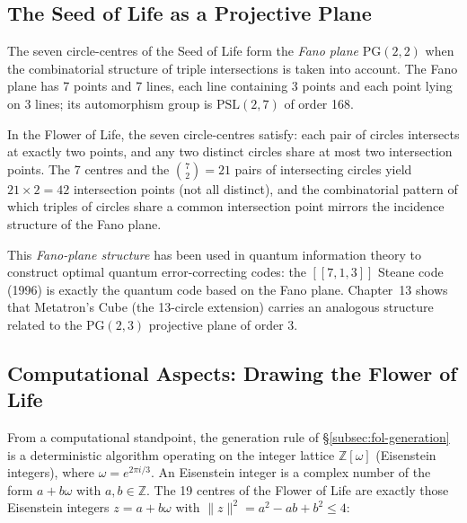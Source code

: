 \subsection{The Seed of Life as a Projective Plane}
\label{subsec:fol-projective}

The seven circle-centres of the Seed of Life form the \emph{Fano plane}
\(\mathrm{PG}(2,2)\) when the combinatorial structure of triple intersections
is taken into account.  The Fano plane has 7 points and 7 lines, each line
containing 3 points and each point lying on 3 lines; its automorphism group
is \(\mathrm{PSL}(2,7)\) of order 168.

In the Flower of Life, the seven circle-centres satisfy: each pair of circles
intersects at exactly two points, and any two distinct circles share at most
two intersection points.  The 7 centres and the \(\binom{7}{2}=21\) pairs
of intersecting circles yield \(21\times 2=42\) intersection points (not all
distinct), and the combinatorial pattern of which triples of circles share
a common intersection point mirrors the incidence structure of the Fano
plane.

This \emph{Fano-plane structure} has been used in quantum information
theory to construct optimal quantum error-correcting codes: the
\([[7,1,3]]\) Steane code (1996) is exactly the quantum code based on
the Fano plane.  Chapter~13 shows that Metatron's Cube (the 13-circle
extension) carries an analogous structure related to the \(\mathrm{PG}(2,3)\)
projective plane of order 3.

\subsection{Computational Aspects: Drawing the Flower of Life}
\label{subsec:fol-computation}

From a computational standpoint, the generation rule of
§\ref{subsec:fol-generation} is a deterministic algorithm operating on
the integer lattice \(\mathbb{Z}[\omega]\) (Eisenstein integers), where
\(\omega = e^{2\pi i/3}\).  An Eisenstein integer is a complex number of
the form \(a + b\omega\) with \(a,b\in\mathbb{Z}\).  The 19 centres of
the Flower of Life are exactly those Eisenstein integers \(z=a+b\omega\)
with \(\|z\|^2=a^2-ab+b^2\le 4\):

